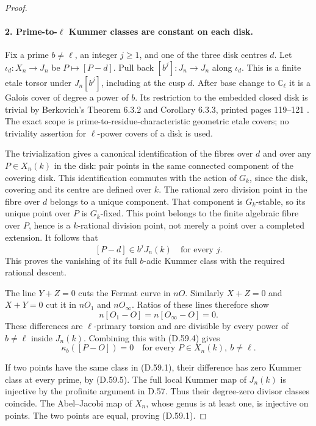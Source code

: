 \begin{proof}
\paragraph{2. Prime-to-$\ell$ Kummer classes are constant on each disk.}

Fix a prime $b\ne\ell$, an integer $j\ge1$, and one
of the three disk centres $d$.  Let
$\iota_d:X_n\to J_n$ be $P\mapsto[P-d]$.  Pull back
$[b^j]:J_n\to J_n$ along $\iota_d$.  This is a finite
etale torsor under $J_n[b^j]$, including at the cusp $d$.
After base change to $\mathbb C_\ell$ it is a Galois
cover of degree a power of $b$.  Its restriction to
the embedded closed disk is trivial by Berkovich's
Theorem 6.3.2 and Corollary 6.3.3, printed pages
119--121 \cite{DE_Berkovich1993}.  The exact scope is
prime-to-residue-characteristic geometric etale
covers; no triviality assertion for $\ell$-power
covers of a disk is used.

The trivialization gives a canonical identification
of the fibres over $d$ and over any $P\in X_n(k)$
in the disk: pair points in the same connected
component of the covering disk.  This identification
commutes with the action of $G_k$, since the disk,
covering and its centre are defined over $k$.
The rational zero division point in the fibre over
$d$ belongs to a unique component.  That component
is $G_k$-stable, so its unique point over $P$ is
$G_k$-fixed.  This point belongs to the finite
algebraic fibre over $P$, hence is a $k$-rational
division point, not merely a point over a completed
extension.  It follows that
\[
                     [P-d]\in b^jJ_n(k)
                       \quad\text{for every }j.       \tag{D.59.4}
\]
This proves the vanishing of its full $b$-adic
Kummer class with the required rational descent.

The line $Y+Z=0$ cuts the Fermat curve in $nO$.
Similarly $X+Z=0$ and $X+Y=0$ cut it in $nO_1$
and $nO_\infty$.  Ratios of these lines therefore
show
\[
                   n[O_1-O]=n[O_\infty-O]=0.
\]
These differences are $\ell$-primary torsion and
are divisible by every power of $b\ne\ell$ inside
$J_n(k)$.  Combining this with (D.59.4) gives
\[
 \kappa_b([P-O])=0\quad
       \text{for every }P\in X_n(k),\ b\ne\ell.         \tag{D.59.5}
\]

If two points have the same class in (D.59.1),
their difference has zero Kummer class at every
prime, by (D.59.5).  The full local Kummer map of
$J_n(k)$ is injective by the profinite argument
in D.57.  Thus their degree-zero divisor classes
coincide.  The Abel--Jacobi map of $X_n$, whose
genus is at least one, is injective on points.
The two points are equal, proving (D.59.1).


\end{proof}

